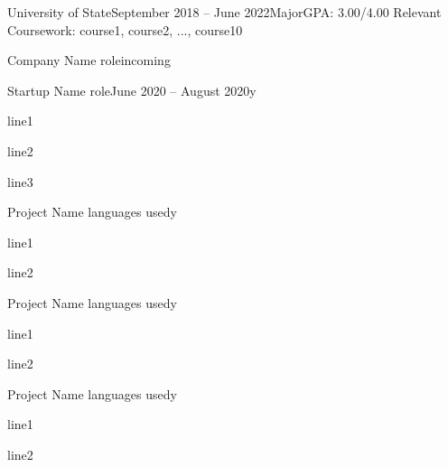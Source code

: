 \documentclass[hidelinks]{simp_styling} %
\begin{document}
\printname
\printbyline



\begin{rEducation}{University of State}{September 2018 – June 2022}{Major}{GPA: 3.00/4.00}
Relevant Coursework: course1, course2, ..., course10
\end{rEducation}


\begin{rSubsection}{Company Name}{\textcolor{gray} \textbar{} role}{incoming}{}
\end{rSubsection}

\begin{rSubsection}{Startup Name}{\textcolor{gray} \textbar{} role}{June 2020 – August 2020}{y}
\item line1
\item line2
\item line3
\end{rSubsection}



\begin{rSubsection}{Project Name}{\textcolor{gray} \textbar{} languages used}{}{y}
\item line1
\item line2
\end{rSubsection}

\begin{rSubsection}{Project Name}{\textcolor{gray} \textbar{} languages used}{}{y}
\item line1
\item line2
\end{rSubsection}

\begin{rSubsection}{Project Name}{\textcolor{gray} \textbar{} languages used}{}{y}
\item line1
\item line2
\end{rSubsection}
\end{document}
